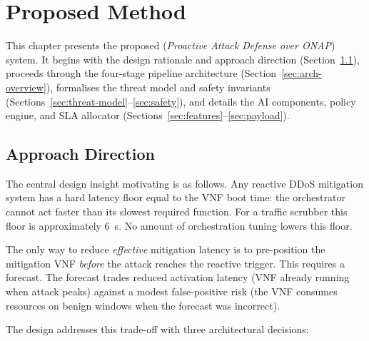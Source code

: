 \chapter{Proposed Method}
\label{ch:proposed}

This chapter presents the proposed \padonap{} (\textit{Proactive Attack Defense over ONAP}) system. It begins with the design rationale and approach direction (Section~\ref{sec:approach}), proceeds through the four-stage pipeline architecture (Section~\ref{sec:arch-overview}), formalises the threat model and safety invariants (Sections~\ref{sec:threat-model}--\ref{sec:safety}), and details the AI components, policy engine, and SLA allocator (Sections~\ref{sec:features}--\ref{sec:payload}).

\section{Approach Direction}
\label{sec:approach}

The central design insight motivating \padonap{} is as follows.
Any reactive DDoS mitigation system has a hard latency floor equal to
the VNF boot time: the orchestrator cannot act faster than its slowest
required function. For a traffic scrubber this floor is approximately
6~s. No amount of orchestration tuning lowers this floor.

The only way to reduce \emph{effective} mitigation latency is to
pre-position the mitigation VNF \emph{before} the attack reaches the
reactive trigger. This requires a forecast. The forecast trades reduced
activation latency (VNF already running when attack peaks) against a
modest false-positive risk (the VNF consumes resources on benign windows
when the forecast was incorrect).

The \padonap{} design addresses this trade-off with three architectural
decisions:

